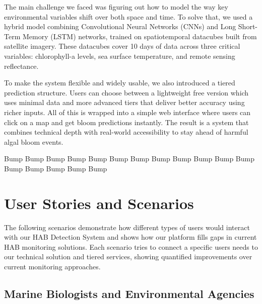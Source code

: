 \documentclass[conference]{IEEEtran}
\begin{document}
The main challenge we faced was figuring out how to model the way key environmental variables shift over both space and time. To solve that, we used a hybrid model combining Convolutional Neural Networks (CNNs) and Long Short-Term Memory (LSTM) networks, trained on spatiotemporal datacubes built from satellite imagery. These datacubes cover 10 days of data across three critical variables: chlorophyll-a levels, sea surface temperature, and remote sensing reflectance.

To make the system flexible and widely usable, we also introduced a tiered prediction structure. Users can choose between a lightweight free version which uses minimal data and more advanced tiers that deliver better accuracy using richer inputs. All of this is wrapped into a simple web interface where users can click on a map and get bloom predictions instantly. The result is a system that combines technical depth with real-world accessibility to stay ahead of harmful algal bloom events.

Bump
\newline
Bump
\newline
Bump
\newline
Bump
\newline
Bump
\newline
Bump
\newline
Bump
\newline
Bump
\newline
Bump
\newline
Bump
\newline
Bump
\newline
Bump
\newline
Bump
\newline
Bump
\newline
Bump
\newline
Bump
\newline
Bump

\section{User Stories and Scenarios}

The following scenarios demonstrate how different types of users would interact with our HAB Detection System and shows how our platform fills gaps in current HAB monitoring solutions. Each scenario tries to connect a specific users needs to our technical solution and tiered services, showing quantified improvements over current monitoring approaches.

\subsection{Marine Biologists and Environmental Agencies}
\end{document}
